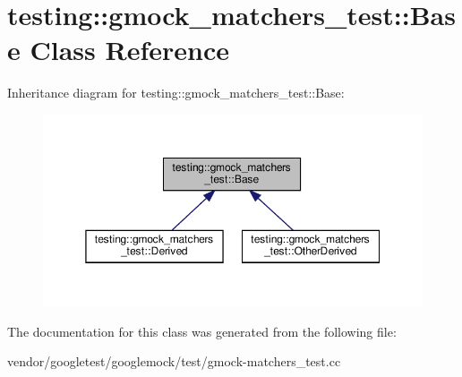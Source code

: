 \hypertarget{classtesting_1_1gmock__matchers__test_1_1_base}{}\section{testing\+:\+:gmock\+\_\+matchers\+\_\+test\+:\+:Base Class Reference}
\label{classtesting_1_1gmock__matchers__test_1_1_base}


Inheritance diagram for testing\+:\+:gmock\+\_\+matchers\+\_\+test\+:\+:Base\+:
\nopagebreak
\begin{figure}[H]
\begin{center}
\leavevmode
\includegraphics[width=350pt]{classtesting_1_1gmock__matchers__test_1_1_base__inherit__graph}
\end{center}
\end{figure}


The documentation for this class was generated from the following file\+:\begin{DoxyCompactItemize}
\item 
vendor/googletest/googlemock/test/gmock-\/matchers\+\_\+test.\+cc\end{DoxyCompactItemize}
